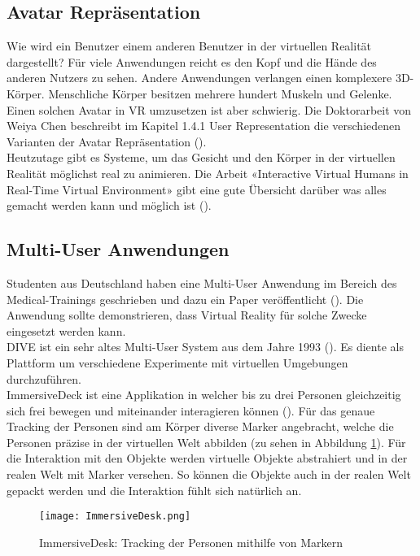 \subsection{Avatar Repräsentation}
\label{ch:avatar_repraesentation}

Wie wird ein Benutzer einem anderen Benutzer in der virtuellen Realität dargestellt? 
Für viele Anwendungen reicht es den Kopf und die Hände des anderen Nutzers zu sehen. Andere Anwendungen verlangen einen komplexere 3D-Körper. Menschliche Körper besitzen mehrere hundert Muskeln und Gelenke. Einen solchen Avatar in VR umzusetzen ist aber schwierig. Die Doktorarbeit von Weiya Chen beschreibt im Kapitel 1.4.1 User Representation die verschiedenen Varianten der Avatar Repräsentation (\cite{chen_collaboration_2015}). \\

\noindent Heutzutage gibt es Systeme, um das Gesicht und den Körper in der virtuellen Realität möglichst real zu animieren. Die Arbeit «Interactive Virtual Humans in Real-Time Virtual Environment» gibt eine gute Übersicht darüber was alles gemacht werden kann und möglich ist (\cite{magnenat-thalmann_interactive_2015}). 

\subsection{Multi-User Anwendungen}

Studenten aus Deutschland haben eine Multi-User Anwendung im Bereich des Medical-Trainings geschrieben und dazu ein Paper veröffentlicht (\cite{schild_applying_2018}). Die Anwendung sollte demonstrieren, dass Virtual Reality für solche Zwecke eingesetzt werden kann. \\

\noindent DIVE ist ein sehr altes Multi-User System aus dem Jahre 1993 (\cite{carlsson_dive_1993}). Es diente als Plattform um verschiedene Experimente mit virtuellen Umgebungen durchzuführen. \\

\noindent ImmersiveDeck ist eine Applikation in welcher bis zu drei Personen gleichzeitig sich frei bewegen und miteinander interagieren können (\cite{podkosova_immersivedeck:_2016}). Für das genaue Tracking der Personen sind am Körper diverse Marker angebracht, welche die Personen präzise in der virtuellen Welt abbilden (zu sehen in Abbildung \ref{fig:immersivedesk}). Für die Interaktion mit den Objekte werden virtuelle Objekte abstrahiert und in der realen Welt mit Marker versehen. So können die Objekte auch in der realen Welt gepackt werden und die Interaktion fühlt sich natürlich an.

\begin{figure}[h!]
	\centering
	\texttt{[image: ImmersiveDesk.png]}
	\caption{ImmersiveDesk: Tracking der Personen mithilfe von Markern}
	\label{fig:immersivedesk}
\end{figure} 

